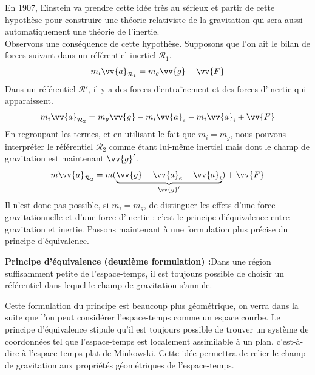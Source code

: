 \documentclass[a4paper,11pt]{report}
\theoremstyle{definition}
\theoremstyle{plain}
\theoremstyle{definition}
\theoremstyle{remark}
\newcommand{\R}{\mathcal{R}}
\begin{document}
            En 1907, Einstein va prendre cette idée très au sérieux et partir de cette hypothèse pour construire une théorie relativiste de la gravitation qui sera aussi automatiquement une théorie de l'inertie.\\
            
            Observons une conséquence de cette hypothèse. Supposons que l'on ait le bilan de forces suivant dans un référentiel inertiel $\R_1$.
            \begin{equation}
                m_i\vv{a}_{\R_1} = m_g\vv{g} + \vv{F}
            \end{equation}
            Dans un référentiel $\R'$, il y a des forces d'entraînement et des forces d'inertie qui apparaissent.
            \begin{equation}
                m_i\vv{a}_{\R_2} = m_g\vv{g} -m_i\vv{a}_e-m_i\vv{a}_i + \vv{F}
            \end{equation}
            En regroupant les termes, et en utilisant le fait que $m_i = m_g$, nous pouvons interpréter le référentiel $\R_2$ comme étant lui-même inertiel mais dont le champ de gravitation est maintenant $\vv{g}'$.
            \begin{equation}
                m\vv{a}_{\R_2} = m(\underbrace{\vv{g} -\vv{a}_e-\vv{a}_i}_{\vv{g}'}) + \vv{F}
            \end{equation}
            Il n'est donc pas possible, si $m_i=m_g$, de distinguer les effets d'une force gravitationnelle et d'une force d'inertie : c'est le principe d'équivalence entre gravitation et inertie. Passons maintenant à une formulation plus précise du principe d'équivalence.
            
            \begin{leftbar}
                \textbf{Principe d'équivalence (deuxième formulation) :}\quad Dans une région suffisamment petite de l'espace-temps, il est toujours possible de choisir un référentiel dans lequel le champ de gravitation s'annule.
            \end{leftbar}
        
            Cette formulation du principe est beaucoup plus géométrique, on verra dans la suite que l'on peut considérer l'espace-temps comme un espace courbe. Le principe d'équivalence stipule qu'il est toujours possible de trouver un système de coordonnées tel que l'espace-temps est localement assimilable à un plan, c'est-à-dire à l'espace-temps plat de Minkowski. Cette idée permettra de relier le champ de gravitation aux propriétés géométriques de l'espace-temps.
        
\end{document}
